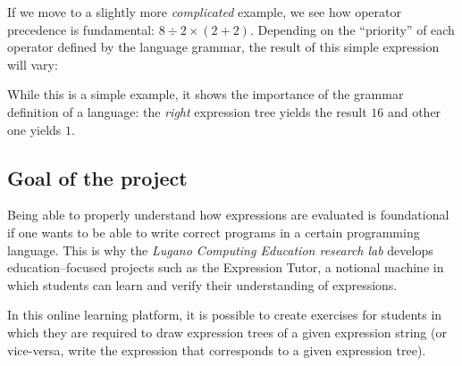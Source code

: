 \documentclass[]{usiinfbachelorproject}
\newcommand{\p}[1]{{\left(#1\right)}}
\begin{document}
\begin{center}
\end{center}

If we move to a slightly more \textit{complicated} example, we see how
operator precedence is fundamental: $ 8 \div 2 \times \p{2 + 2} $. Depending
on the ``priority'' of each operator defined by the language grammar, the result
of this simple expression will vary:

\begin{center}
\end{center}

While this is a simple example, it shows the importance of the grammar
definition of a language: the \textit{right} expression tree yields the result
$ 16 $ and other one yields $ 1 $.

\subsection*{Goal of the project}

Being able to properly understand how expressions are evaluated is foundational
if one wants to be able to write correct programs in a certain programming
language. This is why the \textit{Lugano Computing Education research lab}
develops education–focused projects such as the Expression Tutor, a notional
machine in which students can learn and verify their understanding of
expressions.

In this online learning platform, it is possible to create exercises for
students in which they are required to draw expression trees of a given
expression string (or vice-versa, write the expression that corresponds
to a given expression tree).
\end{document}
